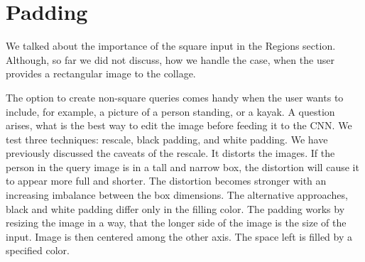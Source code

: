 




\section{Padding}

We talked about the importance of the square input in the Regions section. Although, so far we did not discuss, how we handle the case, when the user provides a rectangular image to the collage.

The option to create non-square queries comes handy when the user wants to include, for example, a picture of a person standing, or a kayak. A question arises, what is the best way to edit the image before feeding it to the CNN. We test three techniques: rescale, black padding, and white padding. We have previously discussed the caveats of the rescale. It distorts the images. If the person in the query image is in a tall and narrow box, the distortion will cause it to appear more full and shorter. The distortion becomes stronger with an increasing imbalance between the box dimensions. The alternative approaches, black and white padding differ only in the filling color. The padding works by resizing the image in a way, that the longer side of the image is the size of the input. Image is then centered among the other axis. The space left is filled by a specified color.



